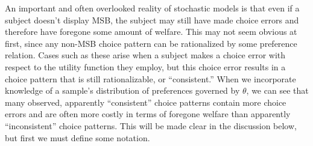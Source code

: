 \documentclass[../main.tex]{subfiles}
\begin{document}
An important and often overlooked reality of stochastic models is that even if a subject doesn't display MSB, the subject may still have made choice errors and therefore have foregone some amount of welfare.
This may not seem obvious at first, since any non-MSB choice pattern can be rationalized by some preference relation.
Cases such as these arise when a subject makes a choice error with respect to the utility function they employ, but this choice error results in a choice pattern that is still rationalizable, or \enquote{consistent.}
When we incorporate knowledge of a sample's distribution of preferences governed by $\theta$, we can see that many observed, apparently \enquote{consistent} choice patterns contain more choice errors and are often more costly in terms of foregone welfare than apparently \enquote{inconsistent} choice patterns.
This will be made clear in the discussion below, but first we must define some notation.
\end{document}
